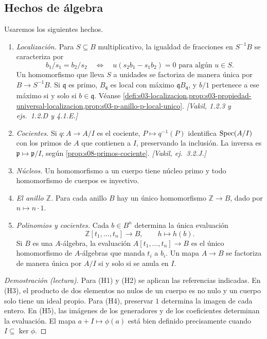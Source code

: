 \subsection{Hechos de álgebra}

\begin{prop}
\label{prop:s10-hechos-algebra}
Usaremos los siguientes hechos.
\begin{enumerate}[label=(H\arabic*)]
\item \emph{Localización.} Para \(S\subseteq B\) multiplicativo, la igualdad de fracciones en \(S^{-1}B\) se caracteriza por
\[
 b_1/s_1=b_2/s_2 \quad\Longleftrightarrow\quad
 u(s_2b_1-s_1b_2)=0\text{ para algún }u\in S.
\]
Un homomorfismo que lleva \(S\) a unidades se factoriza de manera única por \(B\to S^{-1}B\). Si \(\mathfrak q\) es primo, \(B_{\mathfrak q}\) es local con máximo \(\mathfrak q B_{\mathfrak q}\), y \(b/1\) pertenece a ese máximo si y solo si \(b\in\mathfrak q\). Véanse \cref{defi:s03-localizacion,prop:s03-propiedad-universal-localizacion,prop:s03-p-anillo-p-local-unico}. \emph{[Vakil, 1.2.3 y ejs.~1.2.D y 4.1.E.]}
\item \emph{Cocientes.} Si \(q\colon A\to A/I\) es el cociente, \(P\mapsto q^{-1}(P)\) identifica \(\operatorname{Spec}(A/I)\) con los primos de \(A\) que contienen a \(I\), preservando la inclusión. La inversa es \(\mathfrak p\mapsto\mathfrak p/I\), según \cref{prop:s08-primos-cociente}. \emph{[Vakil, ej.~3.2.J.]}
\item \emph{Núcleos.} Un homomorfismo a un cuerpo tiene núcleo primo y todo homomorfismo de cuerpos es inyectivo.
\item \emph{El anillo \(\mathbb Z\).} Para cada anillo \(B\) hay un único homomorfismo \(\mathbb Z\to B\), dado por \(n\mapsto n\cdot 1\).
\item \emph{Polinomios y cocientes.} Cada \(b\in B^n\) determina la única evaluación
\[
 \mathbb Z[t_1,\ldots,t_n]\longrightarrow B,\qquad h\longmapsto h(b).
\]
Si \(B\) es una \(A\)-álgebra, la evaluación \(A[t_1,\ldots,t_n]\to B\) es el único homomorfismo de \(A\)-álgebras que manda \(t_i\) a \(b_i\). Un mapa \(A\to B\) se factoriza de manera única por \(A/I\) si y solo si se anula en \(I\).
\end{enumerate}
\end{prop}
\begin{proof}[Demostración (lectura)]
Para (H1) y (H2) se aplican las referencias indicadas. En (H3), el producto de dos elementos no nulos de un cuerpo es no nulo y un cuerpo solo tiene un ideal propio. Para (H4), preservar \(1\) determina la imagen de cada entero. En (H5), las imágenes de los generadores y de los coeficientes determinan la evaluación. El mapa \(a+I\mapsto\phi(a)\) está bien definido precisamente cuando \(I\subseteq\ker\phi\).
\end{proof}

